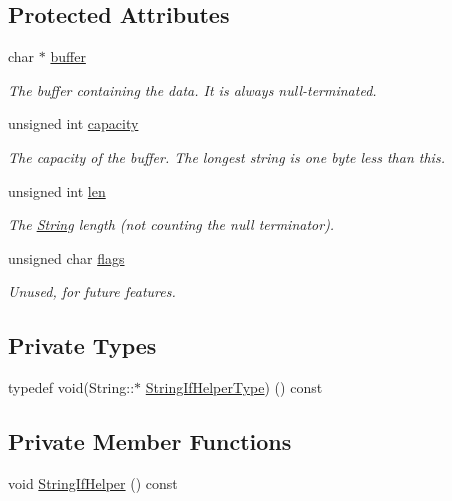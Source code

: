 \subsection*{Protected Attributes}
\begin{DoxyCompactItemize}
\item 
char $\ast$ \hyperlink{class_string_a7892a52a08b6671add931f85a19c1d46}{buffer}
\begin{DoxyCompactList}\small\item\em The buffer containing the data. It is always null-\/terminated. \end{DoxyCompactList}\item 
unsigned int \hyperlink{class_string_af78d6ba64d194d5571319316ee2c41d4}{capacity}
\begin{DoxyCompactList}\small\item\em The capacity of the buffer. The longest string is one byte less than this. \end{DoxyCompactList}\item 
unsigned int \hyperlink{class_string_add7c3370b556b8fd8c669b8c6b40043a}{len}
\begin{DoxyCompactList}\small\item\em The \hyperlink{class_string}{String} length (not counting the null terminator). \end{DoxyCompactList}\item 
unsigned char \hyperlink{class_string_a46d9dadfcefa61aa12563806c477657b}{flags}
\begin{DoxyCompactList}\small\item\em Unused, for future features. \end{DoxyCompactList}\end{DoxyCompactItemize}
\subsection*{Private Types}
\begin{DoxyCompactItemize}
\item 
typedef void(String\+::$\ast$ \hyperlink{class_string_a2f31c4cd9dab650141b50a8350a1ffd4}{String\+If\+Helper\+Type}) () const
\end{DoxyCompactItemize}
\subsection*{Private Member Functions}
\begin{DoxyCompactItemize}
\item 
void \hyperlink{class_string_a7587eade7e0df22dca2c424df32198de}{String\+If\+Helper} () const
\end{DoxyCompactItemize}
